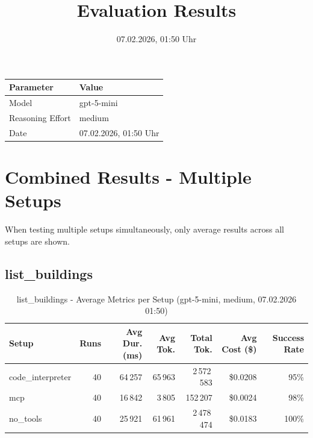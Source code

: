 \documentclass[a4paper,11pt]{article}
\title{Evaluation Results}
\date{07.02.2026, 01:50 Uhr}
\begin{document}
\maketitle

\begin{table}[H]
\centering
\begin{tabular}{l l}
\toprule
\textbf{Parameter} & \textbf{Value} \\
\midrule
Model & gpt-5-mini \\
Reasoning Effort & medium \\
Date & 07.02.2026, 01:50 Uhr \\
\bottomrule
\end{tabular}
\end{table}

\tableofcontents
\clearpage

\section{Combined Results - Multiple Setups}

When testing multiple setups simultaneously, only average results across all setups are shown.

\subsection{list\_buildings}

\begin{table}[H]
\centering
\scriptsize
\caption{list\_buildings - Average Metrics per Setup (gpt-5-mini, medium, 07.02.2026 01:50)}
\label{tab:combined\_list\_buildings\_metrics\_20260207}
\begin{tabular}{l r r r r r r}
\toprule
Setup & Runs & Avg Dur. (ms) & Avg Tok. & Total Tok. & Avg Cost (\$) & Success Rate \\
\midrule
code\_interpreter & 40 & 64\,257 & 65\,963 & 2\,572\,583 & \$0.0208 & 95\% \\
mcp & 40 & 16\,842 & 3\,805 & 152\,207 & \$0.0024 & 98\% \\
no\_tools & 40 & 25\,921 & 61\,961 & 2\,478\,474 & \$0.0183 & 100\% \\
\bottomrule
\end{tabular}
\end{table}
\end{document}

